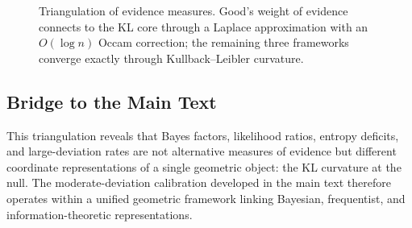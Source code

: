 \documentclass[11pt]{article}
\newcommand{\1}{\mathbf{1}}
\theoremstyle{plain}
\theoremstyle{definition}
\theoremstyle{remark}
\begin{document}
\begin{figure}[ht]
\centering
{}
\caption{Triangulation of evidence measures.  Good's weight of evidence connects to the KL core through a Laplace approximation with an $O(\log n)$ Occam correction; the remaining three frameworks converge exactly through Kullback--Leibler curvature.}\label{fig:triangulation}
\end{figure}

\subsection{Bridge to the Main Text}\label{app:tri-bridge}

This triangulation reveals that Bayes factors, likelihood ratios, entropy deficits, and large-deviation rates are not alternative measures of evidence but different coordinate representations of a single geometric object: the KL curvature at the null.
The moderate-deviation calibration developed in the main text therefore operates within a unified geometric framework linking Bayesian, frequentist, and information-theoretic representations.
\end{document}
